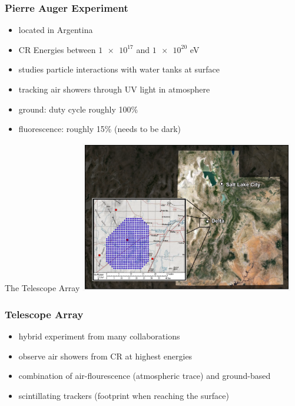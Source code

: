 \documentclass[aspectratio=1610, 9pt]{beamer}
\begin{document}
\begin{frame}\frametitle{Pierre Auger Experiment}
  \begin{itemize}
    \item located in Argentina
    \item CR Energies between $\num{1e17}$ and $\num{1e20}$ eV
    \item studies particle interactions with water tanks at surface
    \item tracking air showers through UV light in atmosphere
    \item ground: duty cycle roughly 100\%
    \item fluorescence: roughly 15\% (needs to be dark)
  \end{itemize}
\end{frame}

\begin{frame}{The Telescope Array}
  \includegraphics[width=0.7\textwidth]{TCA.png}
\end{frame}

\begin{frame}\frametitle{Telescope Array}
  \begin{itemize}
    \item hybrid experiment from many collaborations
    \item observe air showers from CR at highest energies
    \item combination of air-flourescence (atmospheric trace) and ground-based
    \item scintillating trackers (footprint when reaching the surface)
  \end{itemize}
\end{frame}
\end{document}
